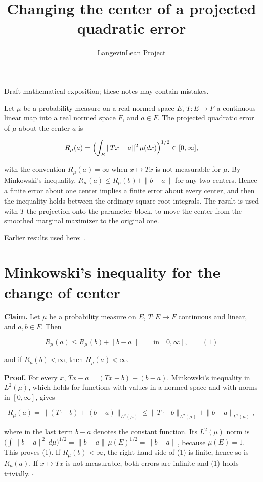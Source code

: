 \documentclass[11pt,a4paper]{article}
\title{\texorpdfstring{Changing the center of a projected quadratic error}{Changing the center of a projected quadratic error}}
\author{LangevinLean Project}
\date{}
\begin{document}
\maketitle
Draft mathematical exposition; these notes may contain mistakes.


Let \(\mu\) be a probability measure on a real normed space \(E\), \(T:E\to F\) a continuous linear map into a real normed space \(F\), and \(a\in F\). The projected quadratic error of \(\mu\) about the center \(a\) is


\[R_\mu(a)=\Bigl(\int_E\|Tx-a\|^2\,\mu(dx)\Bigr)^{1/2}\in[0,\infty],\]


with the convention \(R_\mu(a)=\infty\) when \(x\mapsto Tx\) is not measurable for \(\mu\). By Minkowski's inequality, \(R_\mu(a)\le R_\mu(b)+\|b-a\|\) for any two centers. Hence a finite error about one center implies a finite error about every center, and then the inequality holds between the ordinary square-root integrals. The result is used with \(T\) the projection onto the parameter block, to move the center from the smoothed marginal maximizer to the original one.



Earlier results used here: \cite[Section~3.48]{LangevinLean2026ULASC}.

\section{\texorpdfstring{Minkowski's inequality for the change of center}{Minkowski's inequality for the change of center}}


\textbf{Claim.} Let \(\mu\) be a probability measure on \(E\), \(T:E\to F\) continuous and linear, and \(a,b\in F\). Then


\[R_\mu(a)\le R_\mu(b)+\|b-a\|\qquad\text{in }[0,\infty],\qquad(1)\]


and if \(R_\mu(b)<\infty\), then \(R_\mu(a)<\infty\).




\textbf{Proof.} For every \(x\), \(Tx-a=(Tx-b)+(b-a)\). Minkowski's inequality in \(L^2(\mu)\), which holds for functions with values in a normed space and with norms in \([0,\infty]\), gives


\[R_\mu(a)=\bigl\|(T\cdot-b)+(b-a)\bigr\|_{L^2(\mu)}\le\|T\cdot-b\|_{L^2(\mu)}+\|b-a\|_{L^2(\mu)},\]


where in the last term \(b-a\) denotes the constant function. Its \(L^2(\mu)\) norm is \(\bigl(\int\|b-a\|^2\,d\mu\bigr)^{1/2}=\|b-a\|\,\mu(E)^{1/2}=\|b-a\|\), because \(\mu(E)=1\). This proves (1). If \(R_\mu(b)<\infty\), the right-hand side of (1) is finite, hence so is \(R_\mu(a)\). If \(x\mapsto Tx\) is not measurable, both errors are infinite and (1) holds trivially. \(\square\)
\end{document}
